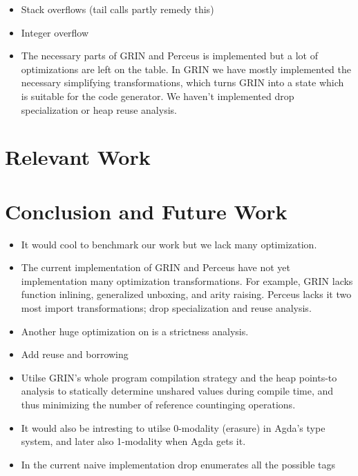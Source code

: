 \documentclass[10pt, twocolumn]{article}
\begin{document}
\begin{itemize}
\item Stack overflows (tail calls partly remedy this)
\item Integer overflow
\item The necessary parts of GRIN and Perceus is implemented but a lot of optimizations are 
      left on the table. In GRIN we have mostly implemented the necessary simplifying transformations,
      which turns GRIN into a state which is suitable for the code generator.
      We haven't implemented drop specialization or heap reuse analysis.
\end{itemize}

\section{Relevant Work}

\section{Conclusion and Future Work}
\begin{itemize}
\item It would cool to benchmark our work but we lack many optimization.
\item The current implementation of GRIN and Perceus have not yet implementation many optimization transformations. For example, GRIN lacks function inlining, generalized unboxing, and arity raising. Perceus lacks it two most import transformations; drop specialization and reuse analysis.
\item Another huge optimization on is a strictness analysis. 
\item Add reuse and borrowing
\item Utilse GRIN's whole program compilation strategy and the heap points-to analysis to statically determine unshared values during compile time, and thus minimizing the number of reference countinging operations.
\item It would also be intresting to utilse 0-modality (erasure) in Agda's type system, and later also 1-modality when Agda gets it.
\item In the current naive implementation drop enumerates all the possible tags 
\end{itemize}



\printbibliography
\end{document}
